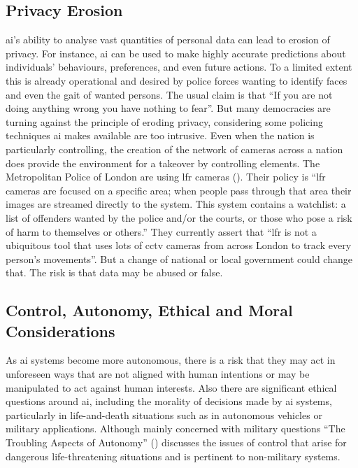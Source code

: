 \subsection{Privacy Erosion}
\gls{ai}'s ability to analyse vast quantities of personal data can lead to erosion of privacy. For instance, \gls{ai} can be used to make highly accurate predictions about individuals’ behaviours, preferences, and even future actions. To a limited extent this is already operational and desired by police forces wanting to identify faces and even the gait of wanted persons. The usual claim is that ``If you are not doing anything wrong you have nothing to fear''. But many democracies are turning against the principle of eroding privacy, considering some policing techniques \gls{ai} makes available are too intrusive. Even when the nation is particularly controlling, the creation of the network of cameras across a nation does provide the environment for a takeover by controlling elements. The Metropolitan Police  of London are using \gls{lfr} cameras (\cite{citation:police2025}). Their policy is ``\Gls{lfr} cameras are focused on a specific area; when people pass through that area their images are streamed directly to the  system. This system contains a watchlist: a list of offenders wanted by the police and/or the courts, or those who pose a risk of harm to themselves or others.''  They currently assert that ``\gls{lfr} is not a ubiquitous tool that uses lots of \gls{cctv} cameras from across London to track every person’s movements''.  But a change of national or local government could change that. The risk is that data may be abused or false.

\subsection{Control, Autonomy, Ethical and Moral Considerations}
As \gls{ai} systems become more autonomous, there is a risk that they may act in unforeseen ways that are not aligned with human intentions or may be manipulated to act against human interests. Also there are significant ethical questions around \gls{ai}, including the morality of decisions made by \gls{ai} systems, particularly in life-and-death situations such as in autonomous vehicles or military applications. Although mainly concerned with military questions  “The Troubling Aspects of Autonomy” (\cite{citation:SCSC152}) discusses the issues of control that arise for dangerous life-threatening situations and is pertinent to non-military systems.

